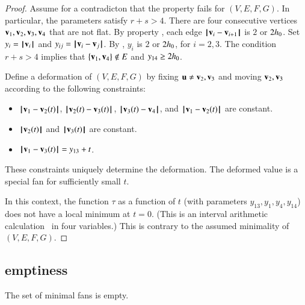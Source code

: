 \begin{proof} 
Assume for a contradicton that the property fails for $(V,E,F,G)$.
In particular, the parameters satisfy $r+s>4$.
There are four consecutive vertices $\v_1,\v_2,\v_3,\v_4$ that are not flat.   By property ,   each edge $\norm{\v_i}{\v_{i+1}}$ is $2$ or $2\hm$. Set $y_i = \normo{\v_i}$ and $y_{ij} = \norm{\v_i}{\v_j}$.   By , $y_i$ is $2$ or $2\hm$, for $i=2,3$.   The condition $r+s>4$ implies that $\{\v_1,\v_4\}\not\in E$ and $y_{14}\ge 2\hm$.

Define a deformation of $(V,E,F,G)$ by fixing $\u\ne \v_2,\v_3$ and moving $\v_2,\v_3$ according to the following constraints:
\begin{itemize}
\item $\norm{\v_1}{\v_2(t)}$, $\norm{\v_2(t)}{\v_3(t)}$, $\norm{\v_3(t)}{\v_4}$, and $\norm{\v_1}{\v_2(t)}$ are constant.
\item $\normo{\v_2(t)}$ and $\normo{\v_3(t)}$ are constant.
\item $\norm{\v_1}{\v_3(t)} = y_{13} + t$.
\end{itemize}
These constraints uniquely determine the deformation. The deformed value is a special fan for sufficiently small $t$.

In this context, the function $\tau$ as a function of $t$ (with parameters $y_{13},y_1,y_4,y_{14}$) does not have a local minimum at $t=0$.
(This is an interval arithmetic calculation~\cite[cc:qua]{hales:2009:nonlinear} in four variables.) %
This is contrary to the assumed minimality of $(V,E,F,G)$.
\end{proof}




\subsection{emptiness}

\begin{lemma}\label{lemma:min-empty}  
The set of minimal fans is empty.
\end{lemma}

